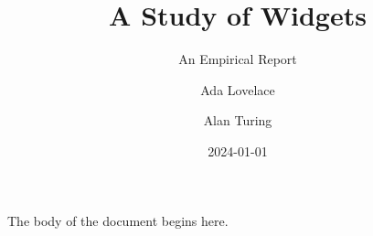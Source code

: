 \documentclass{article}
\title{A Study of Widgets}
\subtitle{An Empirical Report}
\author{Ada Lovelace \and Alan Turing}
\date{2024-01-01}
\begin{document}
\maketitle

The body of the document begins here.
\end{document}
